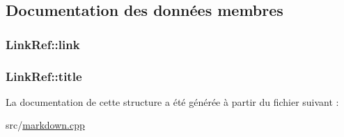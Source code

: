 \subsection{Documentation des données membres}
\hypertarget{struct_link_ref_a7753b92d513129453ff61aef22e9e16f}{}
\subsubsection[{link}]{ Link\+Ref\+::link}\label{struct_link_ref_a7753b92d513129453ff61aef22e9e16f}
\hypertarget{struct_link_ref_ae4e9faaf86404c38b23a6deaea875e33}{}
\subsubsection[{title}]{ Link\+Ref\+::title}\label{struct_link_ref_ae4e9faaf86404c38b23a6deaea875e33}


La documentation de cette structure a été générée à partir du fichier suivant \+:\begin{DoxyCompactItemize}
\item 
src/\hyperlink{markdown_8cpp}{markdown.\+cpp}\end{DoxyCompactItemize}
